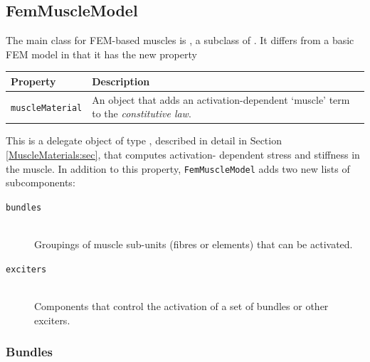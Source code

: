 \subsection{FemMuscleModel}
\label{FemMuscleModel:sec}

The main class for FEM-based muscles is 
, a subclass 
of .  It differs from a basic
FEM model in that it has the new property
\begin{center}
	\begin{tabular}{|ll|}
		\hline
		Property & Description\\
		\hline
		{\tt muscleMaterial} & An object that adds an activation-dependent
		                       `muscle' term to the \emph{constitutive law}.\\
		\hline
	\end{tabular}
\end{center}
This is a delegate object of type 
, described
in detail in Section \ref{MuscleMaterials:sec}, that computes activation-%
dependent stress and stiffness in the muscle. 
In addition to this property, 
{\tt FemMuscleModel} adds two new lists of subcomponents:
\begin{description}
   \item[{\tt bundles}]\mbox{}\\
   Groupings of muscle sub-units (fibres or elements) that can be activated.

   \item[{\tt exciters}]\mbox{}\\
   Components that control the activation of a set of bundles or other exciters.
\end{description}

\subsubsection{Bundles}
\label{MuscleBundles:sec}
\ifLaTeXML{\newline}

